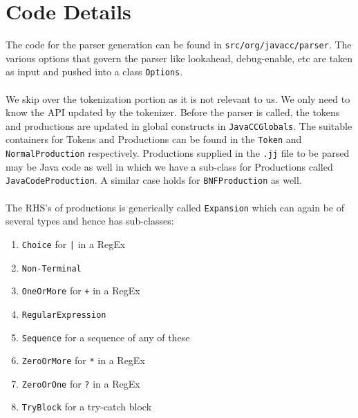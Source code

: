 \documentclass{article}
\begin{document}
\section{Code Details}
\noindent The code for the parser generation can be found in \texttt{src/org/javacc/parser}. The various options that govern the parser like lookahead, debug-enable, etc are taken as input and pushed into a class \texttt{Options}.\\\\We skip over the tokenization portion as it is not relevant to us. We only need to know the API updated by the tokenizer. Before the parser is called, the tokens and productions are updated in global constructs in \texttt{JavaCCGlobals}. The suitable containers for Tokens and Productions can be found in the \texttt{Token} and \texttt{NormalProduction} respectively. Productions supplied in the \texttt{.jj} file to be parsed may be Java code as well in which we have a sub-class for Productions called \texttt{JavaCodeProduction}. A similar case holds for \texttt{BNFProduction} as well.\\\\The RHS's of productions is generically called \texttt{Expansion} which can again be of several types and hence has sub-classes:\begin{enumerate}
\item \texttt{Choice} for \texttt{|} in a RegEx
\item \texttt{Non-Terminal}
\item \texttt{OneOrMore} for \texttt{+} in a RegEx
\item \texttt{RegularExpression}
\item \texttt{Sequence} for a sequence of any of these
\item \texttt{ZeroOrMore} for \texttt{*} in a RegEx
\item \texttt{ZeroOrOne} for \texttt{?} in a RegEx
\item \texttt{TryBlock} for a try-catch block
\end{enumerate}
\end{document}
